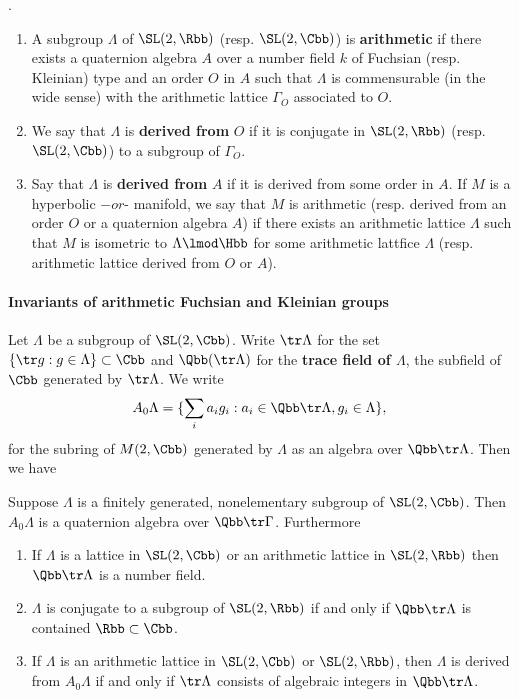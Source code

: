     \begin{definition}.\linebreak
        \begin{enumerate}
            \item     A subgroup $\Lambda$ of $\SL(2,\Rbb)$ (resp. $\SL(2,\Cbb)$) is \textbf{arithmetic} if there exists a quaternion algebra $A$ over a number field $k$ of Fuchsian (resp. Kleinian) type and an order $O$ in $A$ such that $\Lambda$ is commensurable (in the wide sense) with the arithmetic lattice $\Gamma_{O}$ associated to $O$.
            \item  We say that $\Lambda$ is \textbf{derived from} $O$ if it is conjugate in $\SL(2,\Rbb)$ (resp. $\SL(2,\Cbb)$) to a subgroup of $\Gamma_O$.
            \item Say that $\Lambda$ is \textbf{derived from} $A$ if it is derived from some order in $A$. If $M$ is a hyperbolic $- or $- manifold, we say that $M$ is arithmetic (resp. derived from an order $O$ or a quaternion algebra $A$) if there exists an arithmetic lattice $\Lambda$  such that $M$ is isometric to $\Lambda \lmod \Hbb$ for some arithmetic lattfice $\Lambda$ (resp. arithmetic lattice derived from $O$ or $A$).
        \end{enumerate}
    \end{definition}

    \paragraph{Invariants of arithmetic Fuchsian and Kleinian groups}
    Let $\Lambda$ be a subgroup of $\SL(2,\Cbb)$.  Write $\tr \Lambda$ for the set $\{\tr g : g\in \Lambda\} \subset \Cbb$ and  $\Qbb(\tr \Lambda)$ for the \textbf{trace field of $\Lambda$}, the subfield of $\Cbb$ generated by $\tr \Lambda$. We write
    \begin{align*}
        A_0\Lambda = \{ \sum_i a_i g_i : a_i \in \Qbb \tr \Lambda, g_i \in \Lambda\},
    \end{align*}
    for the subring of $M(2,\Cbb)$ generated by $\Lambda$ as an algebra over $\Qbb \tr \Lambda$. Then we have
\begin{proposition}
    Suppose $\Lambda$ is a finitely generated, nonelementary subgroup of $\SL(2,\Cbb)$. Then $A_0\Lambda$ is a quaternion algebra over $\Qbb \tr \Gamma$. Furthermore
    \begin{enumerate}
        \item If $\Lambda$ is a lattice in $\SL(2,\Cbb)$ or an arithmetic lattice in $\SL(2,\Rbb)$ then $\Qbb \tr \Lambda$ is a number field.
        \item $\Lambda$ is conjugate to a subgroup of $\SL(2,\Rbb)$ if and only if $\Qbb \tr \Lambda$ is contained $\Rbb \subset \Cbb$.
        \item If $\Lambda$ is an arithmetic lattice in $\SL(2,\Cbb)$ or $\SL(2,\Rbb)$, then $\Lambda$ is derived from $A_0 \Lambda$ if and only if $\tr \Lambda$ consists of algebraic integers in $\Qbb \tr \Lambda$.
    \end{enumerate}
\end{proposition}




